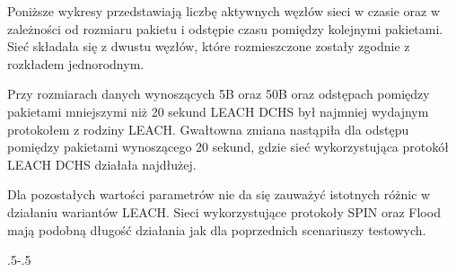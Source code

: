 Poniższe wykresy przedstawiają liczbę aktywnych węzłów sieci w czasie oraz w zależności od rozmiaru pakietu i odstępie czasu pomiędzy kolejnymi pakietami. Sieć składała się z dwustu węzłów, które rozmieszczone zostały zgodnie z rozkładem jednorodnym.

Przy rozmiarach danych wynoszących 5B oraz 50B oraz odstępach pomiędzy pakietami mniejszymi niż 20 sekund LEACH DCHS był najmniej wydajnym protokołem z rodziny LEACH. Gwałtowna zmiana nastąpiła dla odstępu pomiędzy pakietami wynoszącego 20 sekund, gdzie sieć wykorzystująca protokół LEACH DCHS działała najdłużej.

Dla pozostałych wartości parametrów nie da się zauważyć istotnych różnic w działaniu wariantów LEACH. Sieci wykorzystujące protokoły SPIN oraz Flood mają podobną długość działania jak dla poprzednich scenariuszy testowych.

\clearpage
\thispagestyle{empty}

{\pdfpagewidth
    \vspace*{-2cm}
    \noindent\kern.5\pdfpagewidth{}\kern-.5\pdfpagewidth
     \par
     \vspace*{-5cm}
\clearpage
\thispagestyle{empty}
    \vspace*{-2cm}
    \noindent\parbox{\textwidth}{%
    \noindent{}\endgraf
    \vspace{2ex}%
    }
     \par
     \vspace*{-5cm}
\clearpage
}
